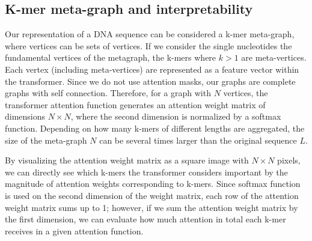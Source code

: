 \documentclass{article}
\begin{document}
\subsection{K-mer meta-graph and interpretability}
Our representation of a DNA sequence can be considered a k-mer meta-graph, where vertices can be sets of vertices. If we consider the single nucleotides the fundamental vertices of the metagraph, the k-mers where $k > 1$ are meta-vertices. Each vertex (including meta-vertices) are represented as a feature vector within the transformer. Since we do not use attention masks, our graphs are complete graphs with self connection.  Therefore, for a graph with $N$ vertices, the transformer attention function generates an attention weight matrix of dimensions $N\times N$, where the second dimension is normalized by a softmax function. Depending on how many k-mers of different lengths are aggregated, the size of the meta-graph $N$ can be several times larger than the original sequence $L$. 

By visualizing the attention weight matrix as a square image with $N\times N$ pixels, we can directly see which k-mers the transformer considers important by the magnitude of attention weights corresponding to k-mers. Since softmax function is used on the second dimension of the weight matrix, each row of the attention weight matrix sums up to 1; however, if we sum the attention weight matrix by the first dimension, we can evaluate how much attention in total each k-mer receives in a given attention function. 
\end{document}
